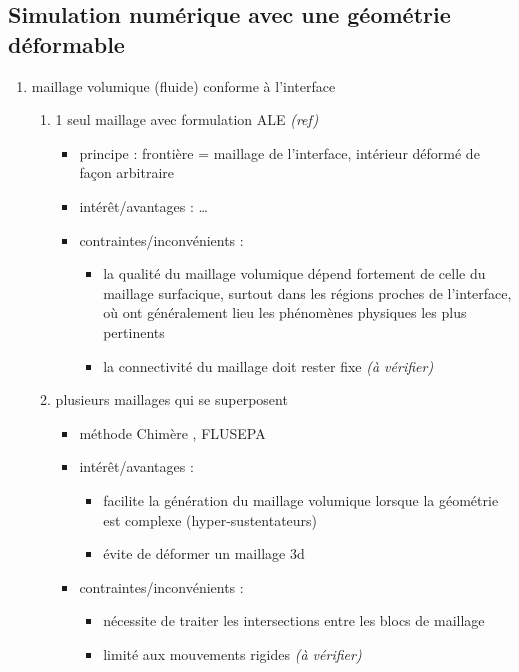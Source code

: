 \subsection{Simulation numérique avec une géométrie déformable}
\begin{enumerate}
	\item maillage volumique (fluide) conforme à l'interface
	\begin{enumerate}
		\item \label{item:methodo_bodyfitted_ALE} 1 seul maillage  avec formulation ALE \emph{(ref)}
		\begin{itemize}
			\item principe : frontière = maillage de l'interface, intérieur déformé de façon arbitraire
			\item intérêt/avantages : \ldots
			\item contraintes/inconvénients : 
			\begin{itemize}
				\item la qualité du maillage volumique dépend fortement de celle du maillage surfacique, surtout dans les régions proches de l'interface, où ont généralement lieu les phénomènes physiques les plus pertinents
				\item la connectivité du maillage doit rester fixe \emph{(à vérifier)}
			\end{itemize}
		\end{itemize}
		
		\item plusieurs maillages  qui se superposent
		\begin{itemize}
			\item méthode Chimère \cite{meakin1989, wang2000}, FLUSEPA \cite{brenner1991}
			\item intérêt/avantages : 
			\begin{itemize}
				\item facilite la génération du maillage volumique lorsque la géométrie est complexe (\eg hyper-sustentateurs)
				\item évite de déformer un maillage 3d
			\end{itemize}						
			\item contraintes/inconvénients : 
			\begin{itemize}
				\item nécessite de traiter les intersections entre les blocs de maillage
				\item limité aux mouvements rigides \emph{(à vérifier)}
			\end{itemize}
		\end{itemize}
	\end{enumerate}
	

\end{enumerate}
